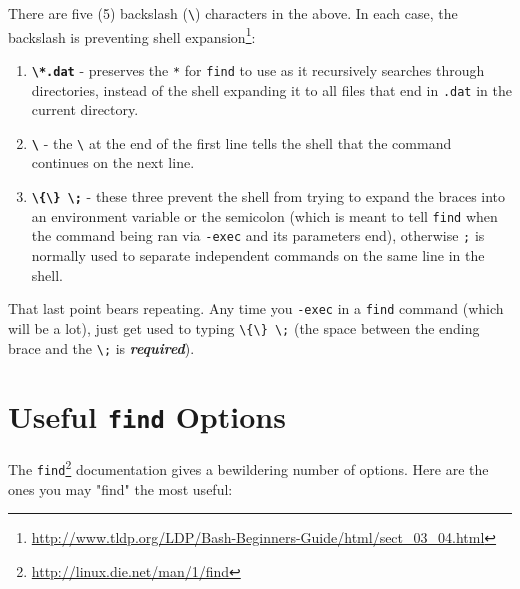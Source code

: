\documentclass[10pt,]{book}
\renewcommand{\href}[2]{#2\footnote{\url{#1}}}
\numberwithin{figure}{chapter}
\begin{document}
There are five (5) backslash (\texttt{\textbackslash{}}) characters in
the above. In each case, the backslash is preventing
\href{http://www.tldp.org/LDP/Bash-Beginners-Guide/html/sect_03_04.html}{shell
expansion}:

\begin{enumerate}
\def\labelenumi{\arabic{enumi}.}
\item
  \textbf{\texttt{\textbackslash{}*.dat}} - preserves the \texttt{*} for
  \texttt{find} to use as it recursively searches through directories,
  instead of the shell expanding it to all files that end in
  \texttt{.dat} in the current directory.
\item
  \textbf{\texttt{\textbackslash{}}} - the \texttt{\textbackslash{}} at
  the end of the first line tells the shell that the command continues
  on the next line.
\item
  \textbf{\texttt{\textbackslash{}\{\textbackslash{}\} \textbackslash{};}}
  - these three prevent the shell from trying to expand the braces into
  an environment variable or the semicolon (which is meant to tell
  \texttt{find} when the command being ran via \texttt{-exec} and its
  parameters end), otherwise \texttt{;} is normally used to separate
  independent commands on the same line in the shell.
\end{enumerate}

That last point bears repeating. Any time you \texttt{-exec} in a
\texttt{find} command (which will be a lot), just get used to typing
\texttt{\textbackslash{}\{\textbackslash{}\} \textbackslash{};} (the
space between the ending brace and the \texttt{\textbackslash{};} is
\textbf{\emph{required}}).

\section*{Useful \texttt{find} Options}\label{useful-find-options}

The \href{http://linux.die.net/man/1/find}{\texttt{find}} documentation
gives a bewildering number of options. Here are the ones you may "find"
the most useful:
\end{document}
